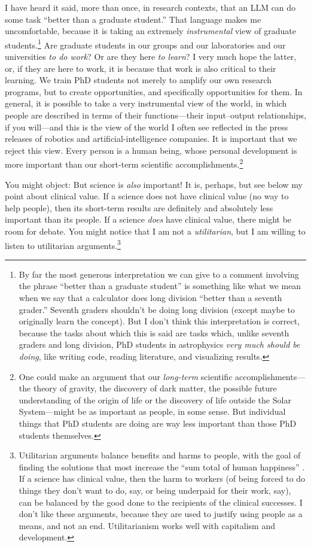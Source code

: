 \documentclass{article}
\begin{document}
I have heard it said, more than once, in research contexts, that an LLM can do some task ``better than a graduate student.''
That language makes me uncomfortable, because it is taking an extremely \emph{instrumental} view of graduate students.\footnote{%
By far the most generous interpretation we can give to a comment involving the phrase ``better than a graduate student'' is something like what we mean when we say that a calculator does long division ``better than a seventh grader.''
Seventh graders shouldn't be doing long division (except maybe to originally learn the concept).
But I don't think this interpretation is correct, because the tasks about which this is said are tasks which, unlike seventh graders and long division, PhD students in astrophysics \emph{very much should be doing}, like writing code, reading literature, and visualizing results.}
Are graduate students in our groups and our laboratories and our universities \emph{to do work}?
Or are they here \emph{to learn}?
I very much hope the latter, or, if they are here to work, it is because that work is also critical to their learning.
We train PhD students not merely to amplify our own research programs, but to create opportunities, and specifically opportunities for them.
In general, it is possible to take a very instrumental view of the world, in which people are described in terms of their functions---their input--output relationships, if you will---and this is the view of the world I often see reflected in the press releases of robotics and artificial-intelligence companies.
It is important that we reject this view.
Every person is a human being, whose personal development is more important than our short-term scientific accomplishments.\footnote{%
One could make an argument that our \emph{long-term} scientific accomplishments---the theory of gravity, the discovery of dark matter, the possible future understanding of the origin of life or the discovery of life outside the Solar System---might be as important as people, in some sense.
But individual things that PhD students are doing are way less important than those PhD students themselves.}

You might object: But science is \emph{also} important!
It is, perhaps, but see below my point about clinical value.
If a science does not have clinical value (no way to help people), then its short-term results are definitely and absolutely less important than its people.
If a science \emph{does} have clinical value, there might be room for debate.
You might notice that I am not a \emph{utilitarian}, but I am willing to listen to utilitarian arguments.\footnote{%
Utilitarian arguments balance benefits and harms to people, with the goal of finding the solutions that most increase the ``sum total of human happiness'' \cite{mill}.
If a science has clinical value, then the harm to workers (of being forced to do things they don't want to do, say, or being underpaid for their work, say), can be balanced by the good done to the recipients of the clinical successes.
I don't like these arguments, because they are used to justify using people as a means, and not an end.
Utilitarianism works well with capitalism and development.}
\end{document}

